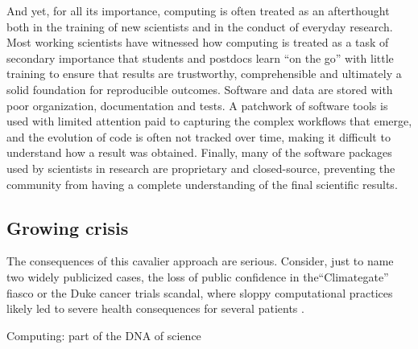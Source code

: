 \documentclass[ChapterTOCs,krantz2]{krantz} %
\begin{document}
And yet, for all its importance, computing is often treated as an
afterthought both in the training of new scientists and in the conduct
of everyday research. Most working scientists have witnessed how computing
is treated as a task of secondary importance that students and postdocs
learn ``on the go'' with little training to ensure that results
are trustworthy, comprehensible and ultimately a solid foundation
for reproducible outcomes. Software and data are stored with poor
organization, documentation and tests. A patchwork of software tools
is used with limited attention paid to capturing the complex workflows
that emerge, and the evolution of code is often not tracked over time,
making it difficult to understand how a result was obtained. Finally,
many of the software packages used by scientists in research are proprietary
and closed-source, preventing the community from having a complete
understanding of the final scientific results.

\subsection{Growing crisis}

The consequences of
this cavalier approach are serious. Consider, just to name two widely
publicized cases, the loss of public confidence in the``Climategate''
fiasco \cite{Hef10} or the Duke cancer trials scandal, where sloppy
computational practices likely led to severe health consequences for
several patients \cite{Cou10}. 

Computing: part of the DNA of science
\end{document}
